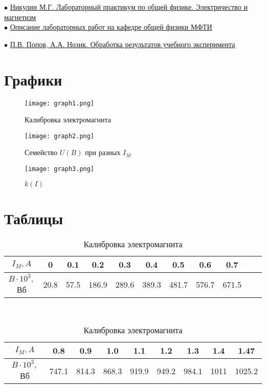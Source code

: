 $\bullet$ \href{https://vk.com/doc-139677307_612194888}{Никулин М.Г. Лабораторный практикум по общей физике. Электричество и магнетизм}\\

$\bullet$ \href{https://mipt.ru/education/chair/physics/S_III/lab_el.php}{Описание лабораторных работ на кафедре общей физики МФТИ}

$\bullet$ \href{https://vk.com/doc-139677307_612194961}{П.В. Попов, А.А. Нозик. Обработка результатов учебного эксперимента}

\newpage
 
\section{Графики}

\begin{figure}[h]
    \centering
    \texttt{[image: graph1.png]}    
    \caption{Калибровка электромагнита}
\end{figure}


\begin{figure}
    \centering
    \texttt{[image: graph2.png]}    
    \caption{Семейство $U(B)$ при разных $I_M$}
\end{figure}


\begin{figure}
    \centering
    \texttt{[image: graph3.png]}    
    \caption{$k(I)$}
\end{figure}


\newpage

\section{Таблицы}

\begin{table}[h]
    \centering
    \begin{tabular}{|c|c|c|c|c|c|c|c|c|c|c|} \hline
$I_M, A$ & 0 & 0.1 & 0.2 & 0.3 & 0.4 & 0.5 & 0.6 & 0.7  \\ \hline
$B\cdot 10^{3}, $Вб & 20.8 & 57.5 & 186.9 & 289.6 & 389.3 & 481.7 & 576.7 & 671.5  \\ \hline

\end{tabular}\\

\begin{tabular}{|c|c|c|c|c|c|c|c|c|}\hline
$I_M, A$              & 0.8 & 0.9 & 1.0 & 1.1 & 1.2 & 1.3 & 1.4 & 1.47 \\ \hline
$B\cdot 10^{3}, $Вб  & 747.1 & 814.3 & 868.3 & 919.9 & 949.2 & 984.1 & 1011 & 1025.2\\ \hline
\end{tabular}\\
 \caption{Калибровка электромагнита}
\end{table}


